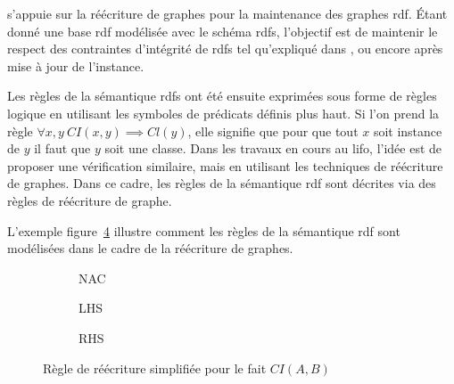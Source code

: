 \cite{chabinUsingGraphGrammar2019} s'appuie sur la réécriture de graphes pour la maintenance des graphes \gls{rdf}.
Étant donné une base \gls{rdf} modélisée avec le schéma \gls{rdfs}, l'objectif est de maintenir le respect des contraintes d'intégrité de \gls{rdfs} tel qu'expliqué dans \cite{flourisFormalFoundationsRDF2013}, \cite{halfeld-ferrariRDFUpdatesConstraints2017} ou encore \cite{chabinConsistentUpdatingDatabases2020} après mise à jour de l'instance.

Les règles de la sémantique \gls{rdfs} ont été ensuite exprimées sous forme de règles logique en utilisant les symboles de prédicats définis plus haut.
Si l'on prend la règle $\forall x,y~CI(x,y) \implies Cl(y)$, elle signifie que pour que tout $x$ soit instance de $y$ il faut que $y$ soit une classe.
Dans les travaux en cours au \gls{lifo}, l'idée est de proposer une vérification similaire, mais en utilisant les techniques de réécriture de graphes.
Dans ce cadre, les règles de la sémantique \gls{rdf} sont décrites via des règles de réécriture de graphe.

L'exemple figure~\ref{fig:gram_rule} illustre comment les règles de la sémantique \gls{rdf} sont modélisées dans le cadre de la réécriture de graphes.

\begin{figure}[ht]
    \centering
    \begin{subfigure}[b]{.3\textwidth}
        \centering
        \caption{NAC}
        \label{fig:gram_rule:nac}
    \end{subfigure}
    \begin{subfigure}[b]{.3\textwidth}
        \centering
        \caption{LHS}
        \label{fig:gram_rule:lhs}
    \end{subfigure}
    \begin{subfigure}[b]{.3\textwidth}
        \centering
        \caption{RHS}
        \label{fig:gram_rule:rhs}
    \end{subfigure}
    \caption{Règle de réécriture simplifiée pour le fait $CI(A,B)$}
    \label{fig:gram_rule}
\end{figure}

